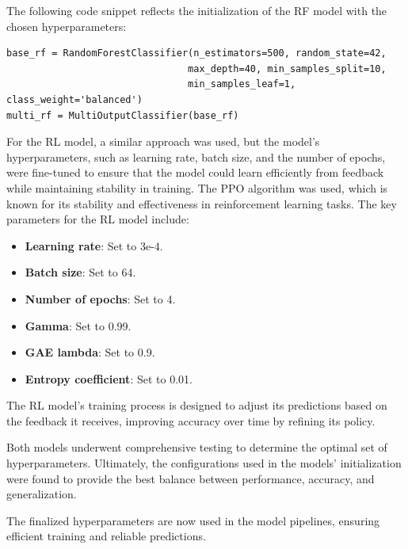 The following code snippet reflects the initialization of the RF model with the chosen hyperparameters:

\vspace{0.2cm}
\noindent
\begin{minipage}{\linewidth}
\begin{verbatim}
base_rf = RandomForestClassifier(n_estimators=500, random_state=42, 
                                max_depth=40, min_samples_split=10, 
                                min_samples_leaf=1, class_weight='balanced')
multi_rf = MultiOutputClassifier(base_rf)
\end{verbatim}
\label{lst:rf_model_initialization}
\end{minipage}
\vspace{0.1cm}

For the \gls{RL} model, a similar approach was used, but the model's hyperparameters, such as learning rate, batch size, and the number of epochs, were fine-tuned to ensure that the model could learn efficiently from feedback while maintaining stability in training. 
The PPO algorithm was used, which is known for its stability and effectiveness in reinforcement learning tasks. 
The key parameters for the \gls{RL} model include:

\begin{itemize}
    \item \textbf{Learning rate}: Set to 3e-4.
    \item \textbf{Batch size}: Set to 64.
    \item \textbf{Number of epochs}: Set to 4.
    \item \textbf{Gamma}: Set to 0.99.
    \item \textbf{GAE lambda}: Set to 0.9.
    \item \textbf{Entropy coefficient}: Set to 0.01.
\end{itemize}

The \gls{RL} model's training process is designed to adjust its predictions based on the feedback it receives, improving accuracy over time by refining its policy.

Both models underwent comprehensive testing to determine the optimal set of hyperparameters. Ultimately, the configurations used in the models' initialization were found to provide the best balance between performance, accuracy, and generalization.

The finalized hyperparameters are now used in the model pipelines, ensuring efficient training and reliable predictions.
